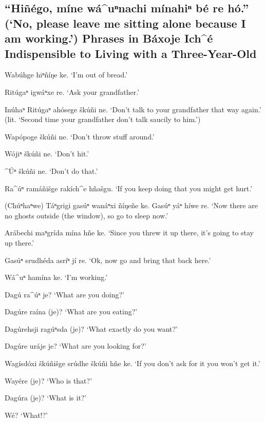 \documentclass[output=paper]{LSP/langsci}
\begin{document}
\subsection*{``Hiñégo, míne wá\^{ }uⁿnachi mínahiⁿ bé re hó.''\newline
(`No, please leave me sitting alone because I am working.')\newline
Phrases in Báxoje Ich\^{ }é Indispensible to Living with a Three-Year-Old}
\begin{list}{}{} \itemsep1pt \parskip0pt 
\item{Wabúhge hiⁿñíŋe ke. `I'm out of bread.'}
\item{Ritúgaⁿ igwáⁿxe re. `Ask your grandfather.'}
\item{Inúhaⁿ Ritúgaⁿ ahósege škúñi ne. `Don't talk to your grandfather that way again.' (lit. `Second time your grandfather don't talk saucily to him.')}
\item{Wapópoge škúñi ne. `Don't throw stuff around.'}
\item{Wójiⁿ škúñi ne. `Don't hit.'}
\item{\^{ }\'Uⁿ škúñi ne. `Don't do that.'}
\item{}
\item{Ra\^{ }úⁿ ramáñišge rakích\^{ }e hñašgu. `If you keep doing that you might get hurt.'}
\item{(Chúⁿhaⁿwe) Táⁿgrigi gasúⁿ wanáⁿxi ñíŋeñe ke. Gasúⁿ yáⁿ híwe re. `Now there are no ghosts outside (the window), so go to sleep now.'}
\item{Arábechi maⁿgrída mína hñe ke. `Since you threw it up there, it's going to stay up there.'}
\item{Gasúⁿ srudhéda asríⁿ jí re. `Ok, now go and bring that back here.'}
\item{}
\item{Wá\^{ }uⁿ hamína ke.	`I'm working.'}
\item{Dagú ra\^{ }úⁿ je? `What are you doing?'}
\item{Dagúre raína (je)? `What are you eating?'}
\item{Dagúrehsji ragúⁿsda (je)? `What exactly do you want?'}
\item{Dagúre uráje je? `What are you looking for?'}
\item{Wagísdóxi škúñišge srúdhe škúñi hñe ke. `If you don't ask for it you won't get it.'}
\item{Wayére (je)? `Who is that?'}
\item{Dagúra (je)? `What is it?'}
\item{Wé? `What!?'}

\end{list}
\end{document}
